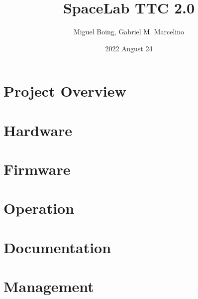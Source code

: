 \documentclass{beamer}
\title[Presentation]{SpaceLab TTC 2.0}
\author[SpaceLab]{Miguel Boing, Gabriel M. Marcelino}
\institute[]{SpaceLab - UFSC}
\date{2022 August 24}
\begin{document}
    
    

    \section{Project Overview}

        

    \section{Hardware}

        

    \section{Firmware}

        

    \section{Operation}

        

    \section{Documentation}

        

    \section{Management}

        

\end{document}
